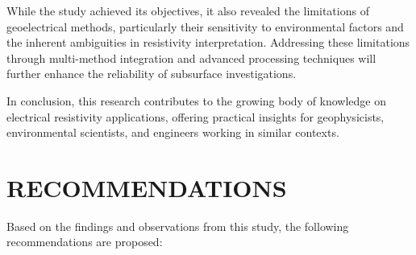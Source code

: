\documentclass[12pt,a4paper]{report}
\begin{document}
While the study achieved its objectives, it also revealed the limitations of geoelectrical methods, particularly their sensitivity to environmental factors and the inherent ambiguities in resistivity interpretation. Addressing these limitations through multi-method integration and advanced processing techniques will further enhance the reliability of subsurface investigations.

In conclusion, this research contributes to the growing body of knowledge on electrical resistivity applications, offering practical insights for geophysicists, environmental scientists, and engineers working in similar contexts.

\section{RECOMMENDATIONS}

Based on the findings and observations from this study, the following recommendations are proposed:
\end{document}
